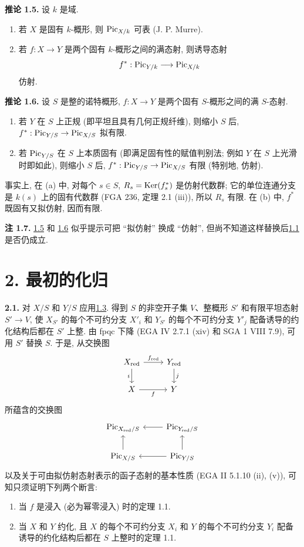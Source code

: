 \textbf{推论 1.5.} 设 $k$ 是域.
\begin{enumerate}[label=\alph*)]
\item 若 $X$ 是固有 $k$-概形, 则 $\operatorname{Pic}_{X/k}$ 可表 (J. P. Murre).
\item 若 $f:X\to Y$ 是两个固有 $k$-概形之间的满态射, 则诱导态射
  \[
    f^*:\operatorname{Pic}_{Y/k}\longrightarrow\operatorname{Pic}_{X/k}
  \]
  仿射.
\end{enumerate}

\textbf{推论 1.6.} 设 $S$ 是整的诺特概形, $f:X\to Y$ 是两个固有 $S$-概形之间的满 $S$-态射.
\begin{enumerate}[label=\alph*)]
\item 若 $Y$ 在 $S$ 上正规 (即平坦且具有几何正规纤维), 则缩小 $S$ 后, $f^*:\operatorname{Pic}_{Y/S}\to\operatorname{Pic}_{X/S}$ 拟有限.
\item 若 $\operatorname{Pic}_{Y/S}$ 在 $S$ 上本质固有 (即满足固有性的赋值判别法; 例如 $Y$ 在 $S$ 上光滑时即如此), 则缩小 $S$ 后, $f^*:\operatorname{Pic}_{Y/S}\to\operatorname{Pic}_{X/S}$ 有限 (特别地, 仿射).
\end{enumerate}
事实上, 在 (a) 中, 对每个 $s\in S$, $R_s=\operatorname{Ker}(f_s^*)$ 是仿射代数群; 它的单位连通分支是 $k(s)$ 上的固有代数群 (FGA 236, 定理 2.1 (iii)), 所以 $R_s$ 有限. 在 (b) 中, $f^*$ 既固有又拟仿射, 因而有限.

\textbf{注 1.7.} \hyperlink{sga6.e12.cor.1-5}{1.5} 和 \hyperlink{sga6.e12.cor.1-6}{1.6} 似乎提示可把 ``拟仿射'' 换成 ``仿射'', 但尚不知道这样替换后\hyperlink{sga6.e12.thm.1-1}{1.1} 是否仍成立.

\section*{2. 最初的化归}

\textbf{2.1.} 对 $X/S$ 和 $Y/S$ 应用\hyperlink{sga6.e12.lem.1-3}{1.3}. 得到 $S$ 的非空开子集 $V$、整概形 $S'$ 和有限平坦态射 $S'\to V$, 使 $X_{S'}$ 的每个不可约分支 $X'_i$ 和 $Y_{S'}$ 的每个不可约分支 $Y'_j$ 配备诱导的约化结构后都在 $S'$ 上整. 由 fpqc 下降 (EGA IV 2.7.1 (xiv) 和 SGA 1 VIII 7.9), 可用 $S'$ 替换 $S$. 于是, 从交换图
\[
\begin{tikzcd}
X_{\red} \arrow[r,"f_{\red}"] \arrow[d,"i"'] & Y_{\red} \arrow[d,"j"]\\
X \arrow[r,"f"'] & Y
\end{tikzcd}
\]
所蕴含的交换图
\[
\begin{tikzcd}
\Pic_{X_{\red}/S} & \Pic_{Y_{\red}/S} \arrow[l]\\
\Pic_{X/S} \arrow[u] & \Pic_{Y/S} \arrow[l] \arrow[u]
\end{tikzcd}
\]
以及关于可由拟仿射态射表示的函子态射的基本性质 (EGA II 5.1.10 (ii), (v)), 可知只须证明下列两个断言:
\begin{enumerate}[label=\Roman*.]
\item 当 $f$ 是浸入 (必为幂零浸入) 时的定理 1.1.
\item 当 $X$ 和 $Y$ 约化, 且 $X$ 的每个不可约分支 $X_i$ 和 $Y$ 的每个不可约分支 $Y_i$ 配备诱导的约化结构后都在 $S$ 上整时的定理 1.1.
\end{enumerate}

